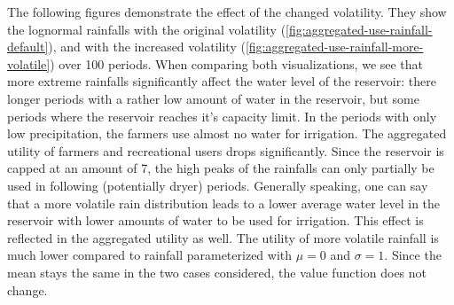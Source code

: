 \documentclass[12pt, a4paper, oneside]{article}
\begin{document}
The following figures demonstrate the effect of the changed volatility. They show the lognormal rainfalls with the original volatility (\ref{fig:aggregated-use-rainfall-default}), and with the increased volatility (\ref{fig:aggregated-use-rainfall-more-volatile}) over 100 periods. 
When comparing both visualizations, we see that more extreme rainfalls significantly affect the water level of the reservoir: there longer periods with a rather low amount of water in the reservoir, but some periods where the reservoir reaches it's capacity limit. 
In the periods with only low precipitation, the farmers use almost no water for irrigation. 
The aggregated utility of farmers and recreational users drops significantly. 
Since the reservoir is capped at an amount of 7, the high peaks of the rainfalls can only partially be used in following (potentially dryer) periods. 
Generally speaking, one can say that a more volatile rain distribution leads to a lower average water level in the reservoir with lower amounts of water to be used for irrigation.
This effect is reflected in the aggregated utility as well. 
The utility of more volatile rainfall is much lower compared to rainfall parameterized with $\mu=0$ and $\sigma=1$. 
Since the mean stays the same in the two cases considered, the value function does not change. 

\clearpage
\end{document}
